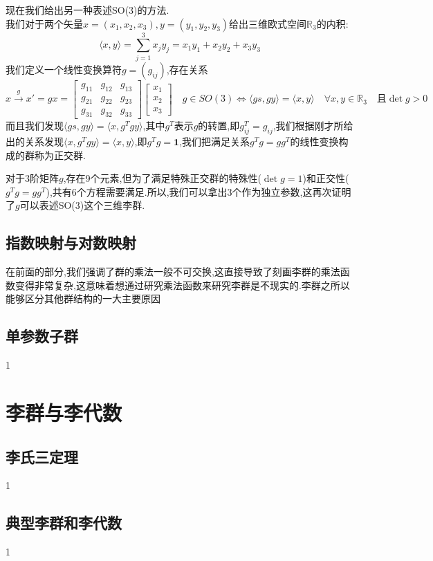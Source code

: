 \begin{example}
	现在我们给出另一种表述SO(3)的方法.\\
	我们对于两个矢量$x=(x_1,x_2,x_3),y=(y_1,y_2,y_3)$给出三维欧式空间$\mathbb{R}_3$的内积:
	\begin{equation}
		\langle x,y\rangle=\sum_{j=1}^{3}x_j y_j=x_1y_1+x_2y_2+x_3y_3
	\end{equation}
	我们定义一个线性变换算符$g=(g_{ij})$,存在关系
	\begin{equation}
		x\xrightarrow{g}x'=gx=\begin{bmatrix}g_{11}&g_{12}&g_{13}\\g_{21}&g_{22}&g_{23}\\g_{31}&g_{32}&g_{33}\end{bmatrix}\begin{bmatrix}x_1\\x_2\\x_3\end{bmatrix}\quad g\in SO(3)\Leftrightarrow\langle gs,gy\rangle=\langle x,y\rangle\quad\forall x,y\in\mathbb{R}_3\quad\text{且}\det g>0
	\end{equation}
	而且我们发现$\langle gs,gy\rangle=\langle x,g^Tgy\rangle$,其中$g^T$表示$g$的转置,即$g_{ij}^T=g_{ij}$,我们根据刚才所给出的关系发现$\langle x,g^Tgy\rangle=\langle x,y\rangle$,即$g^Tg=\textbf{1}$,我们把满足关系$g^Tg=gg^T$的线性变换构成的群称为正交群.
	
	对于3阶矩阵$g$,存在9个元素,但为了满足特殊正交群的特殊性($\det g=1$)和正交性($g^Tg=gg^T$),共有6个方程需要满足.所以,我们可以拿出3个作为独立参数,这再次证明了$g$可以表述SO(3)这个三维李群.
\end{example}
\subsection{指数映射与对数映射}
在前面的部分,我们强调了群的乘法一般不可交换,这直接导致了刻画李群的乘法函数变得非常复杂,这意味着想通过研究乘法函数来研究李群是不现实的.李群之所以能够区分其他群结构的一大主要原因
\subsection{单参数子群}
1
\section{李群与李代数}
\subsection{李氏三定理}
1
\subsection{典型李群和李代数}
1
